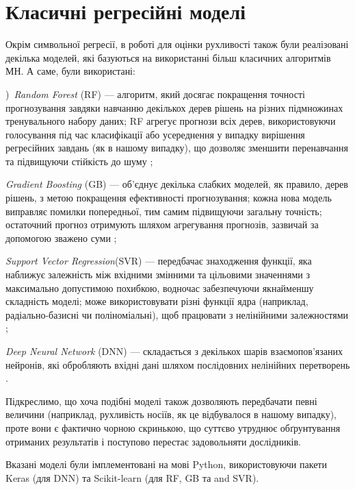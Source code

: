 \documentclass[12pt,a4paper,titlepage,oneside]{book}
\numberwithin{equation}{part}
\begin{document}
\section{Класичні регресійні моделі}\label{secDNN}

Окрім символьної регресії, в роботі для оцінки рухливості також були реалізовані декілька моделей, які базуються на використанні
більш класичних алгоритмів МН. А саме, були використані:

)~\emph{Random Forest} (RF)  --- алгоритм, який досягає покращення точності прогнозування
завдяки навчанню декількох дерев рішень на різних підмножинах тренувального набору даних;
RF агрегує прогнози всіх дерев, використовуючи голосування під час класифікації або усереднення у випадку вирішення регресійних завдань (як в нашому випадку),
що дозволяє зменшити перенавчання та підвищуючи стійкість до шуму \cite{Breiman2001};

\noindent
\emph{Gradient Boosting} (GB) ---  об'єднує декілька слабких моделей, як правило, дерев рішень, з метою
покращення ефективності прогнозування;
кожна нова модель виправляє помилки попередньої, тим самим підвищуючи загальну точність;
остаточний прогноз отримують шляхом агрегування прогнозів, зазвичай за допомогою зважено суми \cite{Natekin2013};

\noindent
\emph{Support Vector Regression}(SVR) --- передбачає знаходження функції, яка наближує залежність між вхідними змінними та цільовими значеннями з максимально допустимою похибкою, водночас забезпечуючи якнайменшу складність моделі;
може використовувати різні функції ядра (наприклад, радіально-базисні чи поліноміальні), щоб працювати з нелінійними залежностями \cite{Cao2020};

\noindent
\emph{Deep Neural Network} (DNN) --- складається з декількох шарів взаємопов'язаних нейронів, які обробляють вхідні дані
шляхом послідовних нелінійних перетворень \cite{Liu2023}.

Підкреслимо, що хоча подібні моделі також дозволяють передбачати певні величини (наприклад, рухливість носіїв,
як це відбувалося в нашому випадку), проте вони є фактично чорною скринькою, що суттєво утруднює обґрунтування отриманих результатів
і поступово перестає задовольняти дослідників.


Вказані моделі були імплементовані на мові Python,
використовуючи пакети Keras (для DNN) та Scikit-learn (для RF, GB та and SVR).
\end{document}
